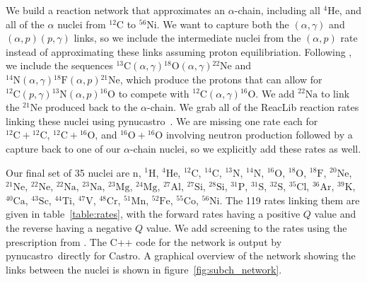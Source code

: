 \documentclass{aastex63}
\newcommand{\castro}{{\sf Castro}}
\newcommand{\pynucastro}{{\sf pynucastro}}
\newcommand{\isotm}[2]{{}^{#2}\mathrm{#1}}
\begin{document}
We build a reaction network that approximates an $\alpha$-chain,
including all $\isotm{He}{4}$, and all of the $\alpha$ nuclei from
$\isotm{C}{12}$ to $\isotm{Ni}{56}$.  We want to capture both the
$(\alpha,\gamma)$ and $(\alpha,p)(p,\gamma)$ links, so we include the
intermediate nuclei from the $(\alpha,p)$ rate instead of
approximating these links assuming proton equilibriation.  
Following \citet{shenbildsten}, we include the sequences
$\isotm{C}{13}(\alpha,\gamma)\isotm{O}{18}(\alpha,\gamma)\isotm{Ne}{22}$
and $\isotm{N}{14}(\alpha,\gamma)\isotm{F}{18}(\alpha,
p)\isotm{Ne}{21}$, which produce the protons that can allow for
$\isotm{C}{12}(p, \gamma)\isotm{N}{13}(\alpha, p)\isotm{O}{16}$ to compete
with $\isotm{C}{12}(\alpha,\gamma)\isotm{O}{16}$.  We add $\isotm{Na}{22}$
to link the $\isotm{Ne}{21}$ produced back to the $\alpha$-chain.  We grab
all of the ReacLib \citep{reaclib} reaction rates linking these nuclei using \pynucastro~\citep{pynucastro}.
We are missing one rate each for $\isotm{C}{12} + \isotm{C}{12}$,
$\isotm{C}{12} + \isotm{O}{16}$, and $\isotm{O}{16} + \isotm{O}{16}$
    involving neutron production followed by a capture back to one of
    our $\alpha$-chain nuclei, so we explicitly add these rates as
    well.

Our final set of 35 nuclei are $\mathrm{n}$, ${}^{1}\mathrm{H}$,
${}^{4}\mathrm{He}$, ${}^{12}\mathrm{C}$, ${}^{14}\mathrm{C}$,
${}^{13}\mathrm{N}$, ${}^{14}\mathrm{N}$, ${}^{16}\mathrm{O}$,
${}^{18}\mathrm{O}$, ${}^{18}\mathrm{F}$, ${}^{20}\mathrm{Ne}$,
${}^{21}\mathrm{Ne}$, ${}^{22}\mathrm{Ne}$, ${}^{22}\mathrm{Na}$,
${}^{23}\mathrm{Na}$, ${}^{23}\mathrm{Mg}$, ${}^{24}\mathrm{Mg}$,
${}^{27}\mathrm{Al}$, ${}^{27}\mathrm{Si}$, ${}^{28}\mathrm{Si}$,
${}^{31}\mathrm{P}$, ${}^{31}\mathrm{S}$, ${}^{32}\mathrm{S}$,
${}^{35}\mathrm{Cl}$, ${}^{36}\mathrm{Ar}$, ${}^{39}\mathrm{K}$,
${}^{40}\mathrm{Ca}$, ${}^{43}\mathrm{Sc}$, ${}^{44}\mathrm{Ti}$,
${}^{47}\mathrm{V}$, ${}^{48}\mathrm{Cr}$, ${}^{51}\mathrm{Mn}$,
${}^{52}\mathrm{Fe}$, ${}^{55}\mathrm{Co}$, ${}^{56}\mathrm{Ni}$.  The 119
rates linking them are given in table~\ref{table:rates}, with the
forward rates having a positive $Q$ value and the reverse having a
negative $Q$ value.  We add screening to the rates using the prescription
from \citet{graboske:1973,alastuey:1978,itoh:1979}.  The C++ code for the network is output by \pynucastro\
directly for \castro.  A graphical overview of the network showing the links
between the nuclei is shown in figure~\ref{fig:subch_network}.
\end{document}
